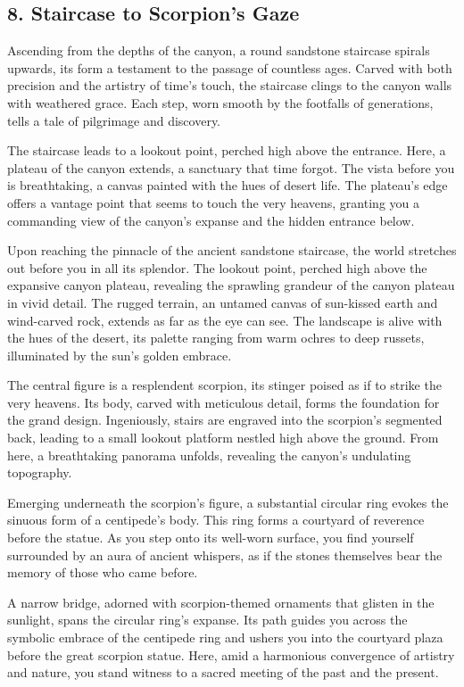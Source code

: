 \subsection*{8. Staircase to Scorpion's Gaze}
{\entryfont
	Ascending from the depths of the canyon, a round sandstone staircase spirals upwards, its form a testament to the passage of countless ages. Carved with both precision and the artistry of time's touch, the staircase clings to the canyon walls with weathered grace. Each step, worn smooth by the footfalls of generations, tells a tale of pilgrimage and discovery.
	
	The staircase leads to a lookout point, perched high above the entrance. Here, a plateau of the canyon extends, a sanctuary that time forgot. The vista before you is breathtaking, a canvas painted with the hues of desert life. The plateau's edge offers a vantage point that seems to touch the very heavens, granting you a commanding view of the canyon's expanse and the hidden entrance below.
}

{\entryfont
	Upon reaching the pinnacle of the ancient sandstone staircase, the world stretches out before you in all its splendor. The lookout point, perched high above the expansive canyon plateau, revealing the sprawling grandeur of the canyon plateau in vivid detail. The rugged terrain, an untamed canvas of sun-kissed earth and wind-carved rock, extends as far as the eye can see. The landscape is alive with the hues of the desert, its palette ranging from warm ochres to deep russets, illuminated by the sun's golden embrace.
	
	The central figure is a resplendent scorpion, its stinger poised as if to strike the very heavens. Its body, carved with meticulous detail, forms the foundation for the grand design. Ingeniously, stairs are engraved into the scorpion's segmented back, leading to a small lookout platform nestled high above the ground. From here, a breathtaking panorama unfolds, revealing the canyon's undulating topography.
	
	Emerging underneath the scorpion's figure, a substantial circular ring evokes the sinuous form of a centipede's body. This ring forms a courtyard of reverence before the statue. As you step onto its well-worn surface, you find yourself surrounded by an aura of ancient whispers, as if the stones themselves bear the memory of those who came before.
	
	A narrow bridge, adorned with scorpion-themed ornaments that glisten in the sunlight, spans the circular ring's expanse. Its path guides you across the symbolic embrace of the centipede ring and ushers you into the courtyard plaza before the great scorpion statue. Here, amid a harmonious convergence of artistry and nature, you stand witness to a sacred meeting of the past and the present.
}

